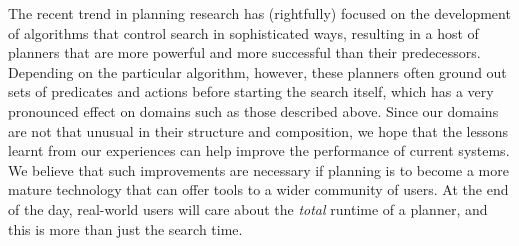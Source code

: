 
The recent trend in planning research has (rightfully) focused on the
development of algorithms that control search in sophisticated ways,
resulting in a host of planners that are more powerful and more successful
than their predecessors. Depending on the particular algorithm, however,
these planners often ground out sets of predicates and actions before
starting the search itself, which has a very pronounced effect on domains
such as those described above. Since our domains are not that unusual in
their structure and composition, we hope that the lessons learnt from our
experiences can help improve the performance of current systems. We believe
that such improvements are necessary if planning is to become a more mature
technology that can offer tools to a wider community of users. At the end
of the day, real-world users will care about the \emph{total} runtime of a
planner, and this is more than just the search time.



